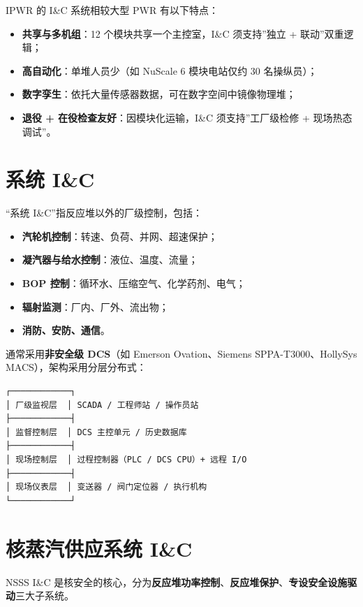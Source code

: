 \documentclass[
  UTF8,
  scheme=plain,
  fontsize=10pt,
  openany
]{ctexbook}
\begin{document}
IPWR 的 I\&C 系统相较大型 PWR 有以下特点：

\begin{itemize}
\tightlist
\item
  \textbf{共享与多机组}：12 个模块共享一个主控室，I\&C 须支持''独立 +
  联动''双重逻辑；
\item
  \textbf{高自动化}：单堆人员少（如 NuScale 6 模块电站仅约 30
  名操纵员）；
\item
  \textbf{数字孪生}：依托大量传感器数据，可在数字空间中镜像物理堆；
\item
  \textbf{退役 + 在役检查友好}：因模块化运输，I\&C 须支持''工厂级检修 +
  现场热态调试''。
\end{itemize}

\section{系统 I\&C}\label{ux7cfbux7edf-ic}

``系统 I\&C''指反应堆以外的厂级控制，包括：

\begin{itemize}
\tightlist
\item
  \textbf{汽轮机控制}：转速、负荷、并网、超速保护；
\item
  \textbf{凝汽器与给水控制}：液位、温度、流量；
\item
  \textbf{BOP 控制}：循环水、压缩空气、化学药剂、电气；
\item
  \textbf{辐射监测}：厂内、厂外、流出物；
\item
  \textbf{消防、安防、通信}。
\end{itemize}

通常采用\textbf{非安全级 DCS}（如 Emerson Ovation、Siemens
SPPA-T3000、HollySys MACS），架构采用分层分布式：

\begin{verbatim}┌────────────┐
│ 厂级监视层  │ SCADA / 工程师站 / 操作员站
├────────────┤
│ 监督控制层  │ DCS 主控单元 / 历史数据库
├────────────┤
│ 现场控制层  │ 过程控制器（PLC / DCS CPU）+ 远程 I/O
├────────────┤
│ 现场仪表层  │ 变送器 / 阀门定位器 / 执行机构
└────────────┘\end{verbatim}

\section{核蒸汽供应系统
I\&C}\label{ux6838ux84b8ux6c7dux4f9bux5e94ux7cfbux7edf-ic}

NSSS I\&C
是核安全的核心，分为\textbf{反应堆功率控制}、\textbf{反应堆保护}、\textbf{专设安全设施驱动}三大子系统。
\end{document}
